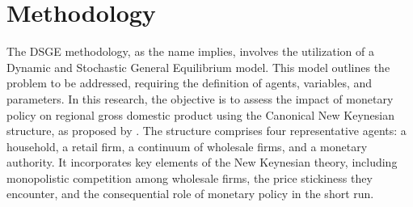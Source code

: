 \documentclass[../thesis.tex]{subfiles}
\begin{document}
\newpage

\section{Methodology}\label{sec:methodology}

The DSGE methodology, as the name implies, involves the utilization of a Dynamic and Stochastic General Equilibrium model. This model outlines the problem to be addressed, requiring the definition of agents, variables, and parameters. In this research, the objective is to assess the impact of monetary policy on regional gross domestic product using the Canonical New Keynesian structure, as proposed by \textcite{solis-garcia_ucb_2022}. The structure comprises four representative agents: a household, a retail firm, a continuum of wholesale firms, and a monetary authority. It incorporates key elements of the New Keynesian theory, including monopolistic competition among wholesale firms, the price stickiness they encounter, and the consequential role of monetary policy in the short run. %


\begin{comment}
	
{
	\setlength{\parskip}{1pt}
	\singlespacing
	
	\etocsettocdepth{3}
	\localtableofcontents
}

\end{comment}
\end{document}
